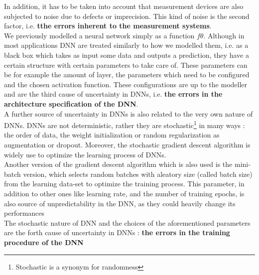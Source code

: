 In addition, it has to be taken into account that measurement devices are also subjected to noise due to defects or imprecision. This kind of noise is the second factor, i.e. \textbf{tthe errors inherent to the measurement systems}. \cite{gawlikowski2021survey}\\
We previously modelled a neural network simply as a function $f\theta$. Although in most applications DNN are treated similarly to how we modelled them, i.e. as a black box which takes as input some data and outputs a prediction, they have a certain structure with certain parameters to take care of. These parameters can be for example the amount of layer, the parameters which need to be configured and the chosen activation function. These configurations are up to the modeller and are the third cause of uncertainty in DNNs, i.e. \textbf{the errors in the architecture specification of the DNN}. \cite{gawlikowski2021survey}\\
A further source of uncertainty in DNNs is also related to the very own nature of DNNs. DNNs are not deterministic, rather they are stochastic\footnote{Stochastic is a synonym for randomness} in many ways : the order of data, the weight initialization or random regularization as augmentation or dropout. \cite{gawlikowski2021survey} Moreover, the stochastic gradient descent algorithm is widely use to optimize the learning process of DNNs. \cite{ruder2017overview}\\
Another version of the gradient descent algorithm which is also used is the mini-batch version, which selects random batches with aleatory size (called batch size) from the learning data-set to optimize the training process. \cite{ruder2017overview} This parameter, in addition to other ones like learning rate, and the number of training epochs, is also source of unpredictability in the DNN, as they could heavily change its performances  \\
The stochastic nature of DNN and the choices of the aforementioned parameters are the forth cause of uncertainty in DNNs : \textbf{the errors in the training procedure of the DNN}\\
